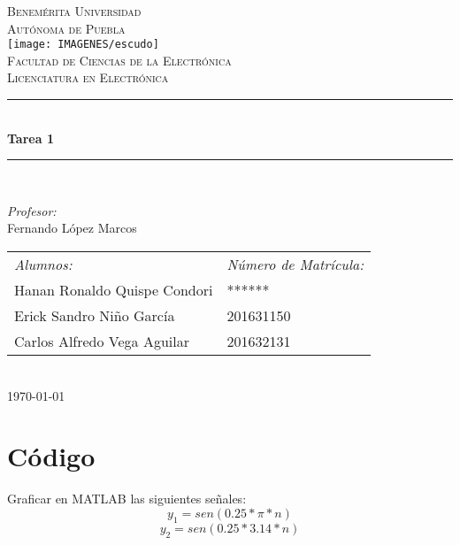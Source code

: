 \documentclass[12pt]{article}
\date{\today}
\begin{document}
\begin{titlepage}
\newcommand{\HRule}{\rule{\linewidth}{0.5mm}} 
\center
\textsc{\LARGE  Benemérita Universidad \\[0.2cm] Autónoma de Puebla}\\[1.5cm] 
\texttt{[image: IMAGENES/escudo]}\\[1cm]
\textsc{\Large Facultad de Ciencias de la Electrónica}\\[0.5cm] 
\textsc{\large Licenciatura en Electrónica}\\[0.5cm]
\HRule \\[0.4cm]
{ \huge \bfseries Tarea 1}\\[0.4cm] 
\HRule \\[1.5cm]
\begin{minipage}{\textwidth}
\center 

\emph{Profesor:} \\
Fernando López Marcos \\[1cm]

\begin{tabular}{ll}
\emph{Alumnos:} & \emph{Número de Matrícula:}\\
Hanan Ronaldo Quispe Condori  & ****** \\
Erick Sandro Niño García & 201631150\\
Carlos Alfredo Vega Aguilar & 201632131 \\
\end{tabular}
\end{minipage}\\[2cm]
\today
\end{titlepage}





\newpage
\section{Código}
Graficar en MATLAB las siguientes señales:
$$y_{1}=sen(0.25*\pi*n)$$
$$y_{2}=sen(0.25*3.14*n)$$

\end{document}
